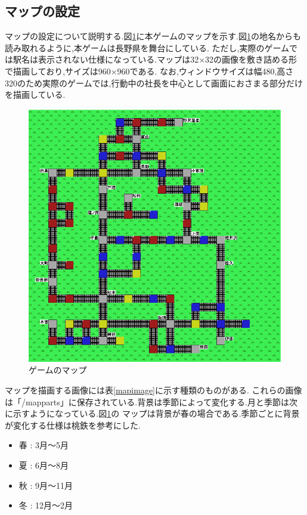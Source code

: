\documentclass[a4j]{jarticle}
\begin{document}
    \subsection{マップの設定}
    マップの設定について説明する.図\ref{map}に本ゲームのマップを示す.図\ref{map}の地名からも読み取れるように,本ゲームは長野県を舞台にしている.
    ただし,実際のゲームでは駅名は表示されない仕様になっている.マップは32$\times$32の画像を敷き詰める形で描画しており,サイズは960$\times$960である.
    なお,ウィンドウサイズは幅480,高さ320のため実際のゲームでは,行動中の社長を中心として画面におさまる部分だけを描画している.

    \begin{figure}[H]
        \centering
        \includegraphics[scale=1.9]{map.eps}
        \caption{ゲームのマップ}
         \label{map}
        \end{figure}

    マップを描画する画像には表\ref{mapimage}に示す種類のものがある.
    これらの画像は「/mapparts」に保存されている.背景は季節によって変化する.月と季節は次に示すようになっている.図\ref{map}の
    マップは背景が春の場合である.季節ごとに背景が変化する仕様は桃鉄を参考にした.
    \begin{itemize}
        \item 春 : 3月～5月 
        \item 夏 : 6月～8月 
        \item 秋 : 9月～11月 
        \item 冬 : 12月～2月 
      \end{itemize}
\end{document}
